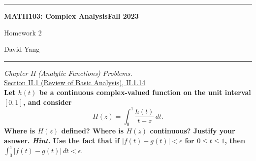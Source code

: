 \documentclass[11pt]{article}
\theoremstyle{definition}
\begin{document}
	\hrule
	\begin{center}
        \textbf{MATH103: Complex Analysis}\hfill \textbf{Fall 2023}\newline

		{\Large Homework 2}

		David Yang
	\end{center}

\hrule

\vspace{1em}

\textit{Chapter II (Analytic Functions) Problems.} \\

\underline{Section II.1 (Review of Basic Analysis), II.1.14} \\

\textbf{Let $h(t)$ be a continuous complex-valued function on the unit interval $[0, 1]$, and consider} \[ H(z) = \int_0^1 \frac{h(t)}{t-z} \, dt. \]
\textbf{Where is $H(z)$ defined? Where is $H(z)$ continuous? Justify your asnwer. \textit{Hint}. Use the fact that if $|f(t) - g(t)| < \epsilon$ for $0 \leq t \leq 1$, then $\int_0^1 |f(t) - g(t)| \, dt  < \epsilon.$}\\
\end{document}
